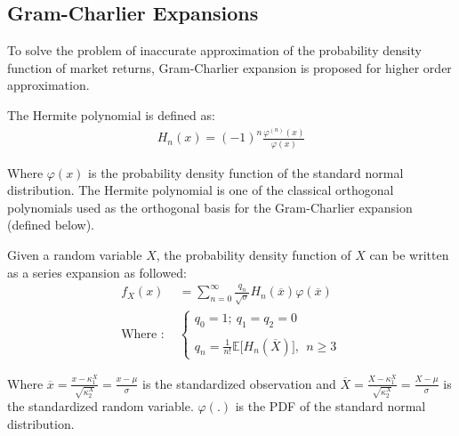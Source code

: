 \subsection{Gram-Charlier Expansions}
To solve the problem of inaccurate approximation of the probability density function of market returns, Gram-Charlier expansion is proposed for higher order approximation.

\begin{definition}
    The Hermite polynomial is defined as:
    \begin{align*}
        H_n(x) = (-1)^n \frac{\varphi^{(n)}(x)}{\varphi(x)}
    \end{align*}

    \noindent\newline Where $\varphi(x)$ is the probability density function of the standard normal distribution. The Hermite polynomial is one of the classical orthogonal polynomials used as the orthogonal basis for the Gram-Charlier expansion \cite{article:tanaka} (defined below).
\end{definition}

\begin{definition}
    Given a random variable $X$, the probability density function of $X$ can be written as a series expansion as followed:
    \begin{align*}
        f_X(x) &= \sum_{n=0}^\infty \frac{q_n}{\sqrt{\sigma}}H_n(\overline{x})\varphi(\overline{x}) \\
        \text{Where : }&
        \begin{cases}
            q_0 = 1; \ q_1 = q_2 = 0
            \\ \\
            q_n = \frac{1}{n!}\mathbb{E}\Big[H_n(\overline{X}) \Big], \ \ n\ge3
        \end{cases}
    \end{align*}

    \noindent\newline Where $\overline{x}=\frac{x - \kappa_1^X}{\sqrt{\kappa_2^X}} = \frac{x - \mu}{\sigma}$ is the standardized observation and $\overline{X}=\frac{X - \kappa_1^X}{\sqrt{\kappa_2^X}} = \frac{X - \mu}{\sigma}$ is the standardized random variable. $\varphi(.)$ is the PDF of the standard normal distribution.
\end{definition}
